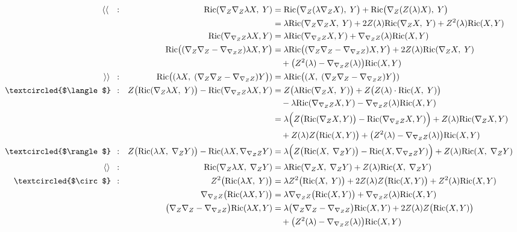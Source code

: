 \documentclass[a4paper,11pt]{article}
\numberwithin{equation}{section}
\theoremstyle{definition}
\newcommand{\R}{{\mathrm{Ric}}}
\begin{document}
\begin{align*}
    \langle\langle \quad:&&
    \R(\nabla_Z\nabla_Z \lambda X,\;Y)
    &= \R\big(\nabla_Z(\lambda\nabla_Z  X),\;Y\big) + \R\big(\nabla_Z (Z(\lambda) X),\;Y\big)\\
    &&&= \lambda\R(\nabla_Z\nabla_Z  X,\;Y) + 2 Z(\lambda)\R(\nabla_Z  X,\;Y) + Z^2(\lambda) \R(X,Y)\\
    &&\R(\nabla_{\nabla_ZZ}\lambda X,Y)
    &= \lambda \R(\nabla_{\nabla_ZZ}X,Y) + \nabla_{\nabla_ZZ}(\lambda)\R(X,Y)\\
    &&\R\big((\nabla_Z\nabla_Z-\nabla_{\nabla_ZZ})\lambda X,Y\big)
    &= \lambda \R\big((\nabla_Z\nabla_Z-\nabla_{\nabla_ZZ}) X,Y\big) + 2 Z(\lambda)\R(\nabla_Z  X,\;Y) 
    \\&&&\quad + \big(Z^2(\lambda)- \nabla_{\nabla_ZZ}(\lambda)\big)\R(X,Y)\\
    \rangle\rangle \;\;:&& 
    \R\big((\lambda X,\;(\nabla_Z\nabla_Z-\nabla_{\nabla_ZZ})Y\big))
    &= \lambda \R\big((X,\;(\nabla_Z\nabla_Z-\nabla_{\nabla_ZZ})Y\big))\\
    \textcircled{$\langle$} \;\,:&&
    Z\big(\R(\nabla_Z \lambda X,\;Y)\big) - \R(\nabla_{\nabla_ZZ}\lambda X,Y)
    &= Z\big(\lambda\R(\nabla_Z X,\;Y)\big)
    + Z\big(Z(\lambda) \cdot \R(X,\;Y)\big)\\
    &&&\quad - \lambda \R(\nabla_{\nabla_ZZ}X,Y) - \nabla_{\nabla_ZZ}(\lambda)\R(X,Y)\\
    &&&= \lambda \Big(Z\big(\R(\nabla_Z X,Y)\big)-
    \R(\nabla_{\nabla_ZZ}X,Y) \Big)+ Z(\lambda) \R(\nabla_Z X, Y)\\
    &&&\quad + Z(\lambda) Z\big(\R(X,Y)\big) + \big(Z^2(\lambda) - \nabla_{\nabla_ZZ}(\lambda)\big)\R(X,Y) \\
    \textcircled{$\rangle$} \;\,:&&
    Z\big(\R(\lambda X,\;\nabla_ZY)\big)- \R(\lambda X,\nabla_{\nabla_ZZ}Y)
    &= \lambda \Big(Z\big(\R(X,\;\nabla_ZY)\big)- \R(X,\nabla_{\nabla_ZZ}Y)\Big)
    + Z(\lambda)\R(X,\;\nabla_ZY)\\
    \langle\rangle \;\;:&&
    \R(\nabla_Z \lambda X, \; \nabla_Z Y)
    &= \lambda \R(\nabla_Z X, \; \nabla_Z Y)
    + Z(\lambda) \R(X,\; \nabla_Z Y)\\
    \textcircled{$\circ$} \;\,:&&
    Z^2\big(\R(\lambda X,\;Y)\big) &= \lambda Z^2\big(\R( X,\;Y)\big)
    + 2 Z(\lambda) Z\big(\R(X,Y)\big)
    + Z^2(\lambda) \R(X,Y)\\
    &&\nabla_{\nabla_ZZ}\big(\R(\lambda X,Y)\big)
    &=\lambda\nabla_{\nabla_ZZ}\big(\R( X,Y)\big)
    + \nabla_{\nabla_ZZ}(\lambda)\R(X,Y)\\
    && \big(\nabla_Z\nabla_Z-\nabla_{\nabla_Z Z}\big)\R(\lambda X,Y)
    &= \lambda \big(\nabla_Z\nabla_Z-\nabla_{\nabla_Z Z}\big)\R(X,Y) + 2 Z(\lambda) Z\big(\R(X,Y)\big)\\
    &&&\quad + \big(Z^2(\lambda)-\nabla_{\nabla_ZZ}(\lambda)\big) \R(X,Y)
\end{align*}
\end{document}
